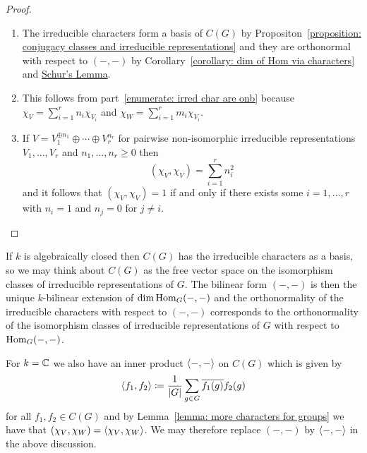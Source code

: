 \begin{proof}
  \leavevmode
  \begin{enumerate}
    \item
      The irreducible characters form a basis of $C(G)$ by Propositon~\ref{proposition: conjugacy classes and irreducible representations} and they are orthonormal with respect to $(-,-)$ by Corollary~\ref{corollary: dim of Hom via characters} and \hyperref[proposition: Schurs lemma representations]{Schur’s Lemma}.
    \item
      This follows from part~\ref*{enumerate: irred char are onb} because $\chi_V = \sum_{i=1}^r n_i \chi_{V_i}$ and $\chi_W = \sum_{i=1}^r m_i \chi_{V_i}$.
    \item 
      If $V = V_1^{\oplus n_1} \oplus \dotsb \oplus V_r^{n_r}$ for pairwise non-isomorphic irreducible representations $V_1, \dotsc, V_r$ and $n_1, \dotsc, n_r \geq 0$ then
      \[
          ( \chi_V, \chi_V )
        = \sum_{i=1}^r n_i^2
      \]
      and it follows that $(\chi_V, \chi_V) = 1$ if and only if there exists some $i = 1, \dotsc, r$ with $n_i = 1$ and $n_j = 0$ for $j \neq i$.
    \qedhere
  \end{enumerate}
\end{proof}


\begin{remark}
  If $k$ is algebraically closed then $C(G)$ has the irreducible characters as a basis, so we may think about $C(G)$ as the free vector space on the isomorphism classes of irreducible representations of $G$.
  The bilinear form $(-,-)$ is then the unique $k$-bilinear extension of $\dim \operatorname{Hom}_G(-,-)$ and the orthonormality of the irreducible characters with respect to $(-,-)$ corresponds to the orthonormality of the isomorphism classes of irreducible representations of $G$ with respect to $\operatorname{Hom}_G(-,-)$.
\end{remark}


\begin{fluff}
  For $k = \mathbb{C}$ we also have an inner product $\langle -,- \rangle$ on $C(G)$ which is given by
  \[
              \langle f_1, f_2 \rangle
    \coloneqq  \frac{1}{|G|} \sum_{g \in G} \overline{f_1(g)} f_2(g)
  \]
  for all $f_1, f_2 \in C(G)$ and by Lemma~\ref{lemma: more characters for groups} we have that $(\chi_V, \chi_W) = \langle \chi_V, \chi_W \rangle$.
   We may therefore replace $(-,-)$ by $\langle -,- \rangle$ in the above discussion.
\end{fluff}




